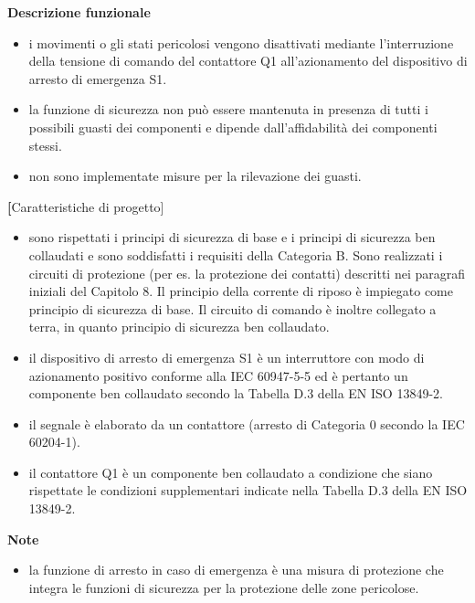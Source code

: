 \textbf{Descrizione funzionale}
\begin{itemize}
    \item i movimenti o gli stati pericolosi vengono disattivati mediante l'interruzione della tensione di comando del contattore Q1 all'azionamento del dispositivo di arresto di emergenza S1.
    \item la funzione di sicurezza non può essere mantenuta in presenza di tutti i possibili guasti dei componenti e dipende dall'affidabilità dei componenti stessi.
    \item non sono implementate misure per la rilevazione dei guasti.
\end{itemize}

\textbf[Caratteristiche di progetto]
\begin{itemize}
    \item sono rispettati i principi di sicurezza di base e i principi di sicurezza ben collaudati e sono soddisfatti i requisiti della Categoria B. Sono realizzati i circuiti di protezione (per es. la protezione dei contatti) descritti nei paragrafi iniziali del Capitolo 8. Il principio della corrente di riposo è impiegato come principio di sicurezza di base. Il circuito di comando è inoltre collegato a terra, in quanto principio di sicurezza ben collaudato.
    \item il dispositivo di arresto di emergenza S1 è un interruttore con modo di azionamento positivo conforme alla IEC 60947-5-5 ed è pertanto un componente ben collaudato secondo la Tabella D.3 della EN ISO 13849-2.
    \item il segnale è elaborato da un contattore (arresto di Categoria 0 secondo la IEC 60204-1).
    \item il contattore Q1 è un componente ben collaudato a condizione che siano rispettate le condizioni supplementari indicate nella Tabella D.3 della EN ISO 13849-2.
\end{itemize}

\textbf{Note}
\begin{itemize}
    \item la funzione di arresto in caso di emergenza è una misura di protezione che integra le funzioni di sicurezza per la protezione delle zone pericolose.
\end{itemize}


